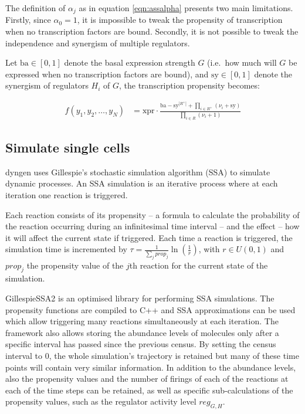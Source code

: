 \documentclass[
  table,
  10pt,
  a4paper]{article}
\begin{document}
The definition of \(\alpha_j\) as in equation \ref{eqn:assalpha}
presents two main limitations. Firstly, since \(\alpha_0 = 1\), it is
impossible to tweak the propensity of transcription when no
transcription factors are bound. Secondly, it is not possible to tweak
the independence and synergism of multiple regulators.

Let \(\text{ba} \in [0,1]\) denote the basal expression strength \(G\)
(i.e.~how much will \(G\) be expressed when no transcription factors are
bound), and \(\text{sy} \in [0,1]\) denote the synergism of regulators
\(H_i\) of \(G\), the transcription propensity becomes:

\begin{align}
f(y_1, y_2, \ldots, y_N) & = \text{xpr} \cdot \frac{\text{ba} - \text{sy}^{|R^+|} + \prod_{i \in R^+} (\nu_i + \text{sy})}{\prod_{i \in R} (\nu_i + 1)}
\end{align}

\hypertarget{sec:dyngen-simcell}{%
\subsection{Simulate single cells}\label{sec:dyngen-simcell}}

dyngen uses Gillespie's stochastic simulation algorithm (SSA)
\autocite{gillespie_exactstochasticsimulation_1977} to simulate dynamic
processes. An SSA simulation is an iterative process where at each
iteration one reaction is triggered.

Each reaction consists of its propensity -- a formula to calculate the
probability of the reaction occurring during an infinitesimal time
interval -- and the effect -- how it will affect the current state if
triggered. Each time a reaction is triggered, the simulation time is
incremented by
\(\tau = \frac{1}{\sum_j prop_j} \ln\left(\frac{1}{r}\right)\), with
\(r \in U(0, 1)\) and \(prop_j\) the propensity value of the \(j\)th
reaction for the current state of the simulation.

GillespieSSA2 is an optimised library for performing SSA simulations.
The propensity functions are compiled to C++ and SSA approximations can
be used which allow triggering many reactions simultaneously at each
iteration. The framework also allows storing the abundance levels of
molecules only after a specific interval has passed since the previous
census. By setting the census interval to 0, the whole simulation's
trajectory is retained but many of these time points will contain very
similar information. In addition to the abundance levels, also the
propensity values and the number of firings of each of the reactions at
each of the time steps can be retained, as well as specific
sub-calculations of the propensity values, such as the regulator
activity level \(reg_{G,H}\).
\end{document}
